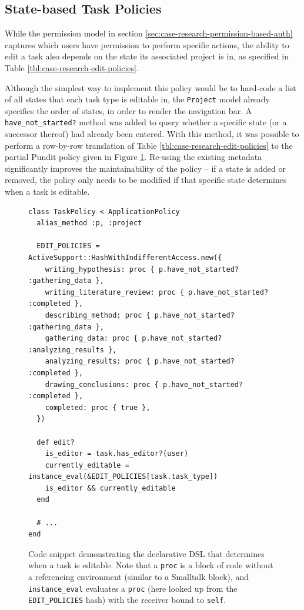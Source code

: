 \documentclass[document.tex]{subfiles}
\begin{document}
\FloatBarrier

\subsection {State-based Task Policies}

While the permission model in section \ref{sec:case-research-permission-based-auth} captures which users have permission to perform specific actions, the ability to edit a task also depends on the state its associated project is in, as specified in Table \ref{tbl:case-research-edit-policies}.

Although the simplest way to implement this policy would be to hard-code a list of all states that each task type is editable in, the \verb!Project! model already specifies the order of states, in order to render the navigation bar.
A \verb!have_not_started?! method was added to query whether a specific state (or a successor thereof) had already been entered.
With this method, it was possible to perform a row-by-row translation of Table \ref{tbl:case-research-edit-policies} to the partial Pundit policy given in Figure \ref{fig:case-research-state-based-policy}.
Re-using the existing metadata significantly improves the maintainability of the policy -- if a state is added or removed, the policy only needs to be modified if that specific state determines when a task is editable.


\begin{figure}[!ht]
  \begin{lstlisting}
class TaskPolicy < ApplicationPolicy
  alias_method :p, :project

  EDIT_POLICIES = ActiveSupport::HashWithIndifferentAccess.new({
    writing_hypothesis: proc { p.have_not_started? :gathering_data },
    writing_literature_review: proc { p.have_not_started? :completed },
    describing_method: proc { p.have_not_started? :gathering_data },
    gathering_data: proc { p.have_not_started? :analyzing_results },
    analyzing_results: proc { p.have_not_started? :completed },
    drawing_conclusions: proc { p.have_not_started? :completed },
    completed: proc { true },
  })

  def edit?
    is_editor = task.has_editor?(user)
    currently_editable = instance_eval(&EDIT_POLICIES[task.task_type])
    is_editor && currently_editable
  end

  # ...
end
  \end{lstlisting}
  \cprotect\caption{Code snippet demonstrating the declarative DSL that determines when a task is editable. Note that a \verb!proc! is a block of code without a referencing environment (similar to a Smalltalk block), and \verb!instance_eval! evaluates a \verb!proc! (here looked up from the \verb!EDIT_POLICIES! hash) with the receiver bound to \verb!self!.}
  \label{fig:case-research-state-based-policy}
\end{figure}
\end{document}
